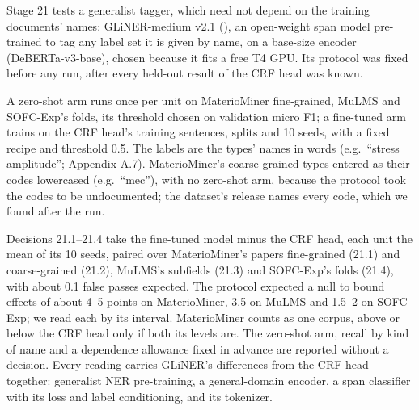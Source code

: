 \documentclass[11pt,a4paper]{article}
\begin{document}
Stage 21 tests a generalist tagger, which need not depend on the training
documents' names: GLiNER-medium v2.1 (\citealp{zaratiana2024gliner}), an open-weight
span model pre-trained to tag any label set it is given by name, on a
base-size encoder (DeBERTa-v3-base), chosen because it fits a free T4 GPU.
Its protocol was fixed before any run, after every held-out result of the
CRF head was known.

A zero-shot arm runs once per unit on MaterioMiner fine-grained, MuLMS and
SOFC-Exp's folds, its threshold chosen on validation micro F1; a
fine-tuned arm trains on the CRF head's training sentences, splits and 10
seeds, with a fixed recipe and threshold 0.5. The labels are the types'
names in words (e.g.~``stress amplitude''; Appendix A.7). MaterioMiner's
coarse-grained types entered as their codes lowercased (e.g.~``mec''), with
no zero-shot arm, because the protocol took the codes to be undocumented;
the dataset's release names every code, which we found after the run.

Decisions 21.1--21.4 take the fine-tuned model minus the CRF head, each
unit the mean of its 10 seeds, paired over MaterioMiner's papers
fine-grained (21.1) and coarse-grained (21.2), MuLMS's subfields (21.3)
and SOFC-Exp's folds (21.4), with about 0.1 false passes expected. The
protocol expected a null to bound effects of about 4--5 points on
MaterioMiner, 3.5 on MuLMS and 1.5--2 on SOFC-Exp; we read each by its
interval. MaterioMiner counts as one corpus, above or below the CRF head
only if both its levels are. The zero-shot arm, recall by kind of name and
a dependence allowance fixed in advance are reported without a decision.
Every reading carries GLiNER's differences from the CRF head together:
generalist NER pre-training, a general-domain encoder, a span classifier
with its loss and label conditioning, and its tokenizer.
\end{document}

